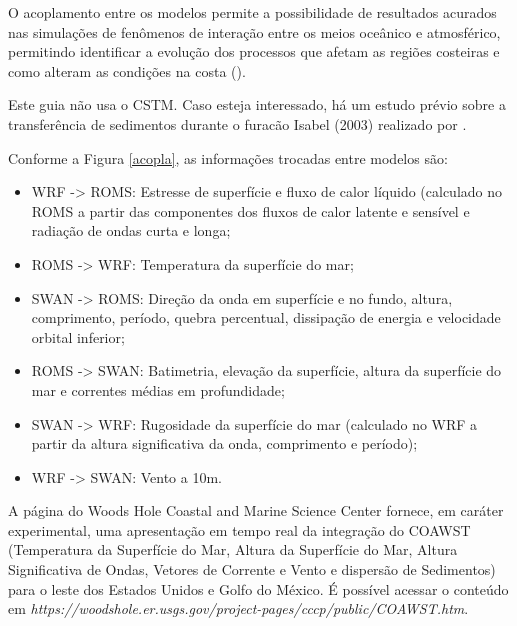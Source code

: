\noindent O acoplamento entre os modelos permite a possibilidade de resultados acurados nas simulações de fenômenos de interação entre os meios oceânico e atmosférico, permitindo identificar a evolução dos processos que afetam as regiões costeiras e como alteram as condições na costa (\cite{Pullen2018, Miller2018}).
\bigskip

\begin{tcolorbox}[enhanced,
  grow to left by   = 0cm,
  grow to right by  = 0cm,
  enlarge top by    = 0cm,
  enlarge bottom by = 0cm,
  tcbox raise base,
  boxrule           = 1.0pt,
  left              = 18mm,
  colframe          = red!50!black,coltext=red!25!black,colback=red!10!white,
  overlay           = {\begin{tcbclipinterior}\fill[red!75!blue!50!white] (frame.south west)
    rectangle node[text=white,font=\sffamily\bfseries\footnotesize,rotate=0] {ATENÇÃO} ([xshift=18mm]frame.north west);\end{tcbclipinterior}}]
Este guia não usa o CSTM. Caso esteja interessado, há um estudo prévio sobre a transferência de sedimentos durante o furacão Isabel (2003) realizado por \textcite{Warner2010}.
\end{tcolorbox}
\bigskip


\noindent Conforme a Figura \textcolor{bleu_cite}{\ref{acopla}}, as informações trocadas entre modelos são:
\bigskip

\begin{itemize}
\item WRF -> ROMS: Estresse de superfície e fluxo de calor líquido (calculado no ROMS a partir das componentes dos fluxos de calor latente e sensível e radiação de ondas curta e longa;
\item ROMS -> WRF: Temperatura da superfície do mar;
\item SWAN -> ROMS: Direção da onda em superfície e no fundo, altura, comprimento, período, quebra percentual, dissipação de energia e velocidade orbital inferior;
\item ROMS -> SWAN: Batimetria, elevação da superfície, altura da superfície do mar e correntes médias em profundidade;
\item SWAN -> WRF: Rugosidade da superfície do mar (calculado no WRF a partir da altura significativa da onda, comprimento e período);
\item WRF -> SWAN: Vento a 10m.
\end{itemize}
\bigskip
\noindent A página do Woods Hole Coastal and Marine Science Center fornece, em caráter experimental, uma apresentação em tempo real da integração do COAWST (Temperatura da Superfície do Mar, Altura da Superfície do Mar, Altura Significativa de Ondas, Vetores de Corrente e Vento e dispersão de Sedimentos) para o leste dos Estados Unidos e Golfo do México. É possível acessar o conteúdo em \textcolor{bleu_cite}{\textit{https://woodshole.er.usgs.gov/project-pages/cccp/public/COAWST.htm}}.


